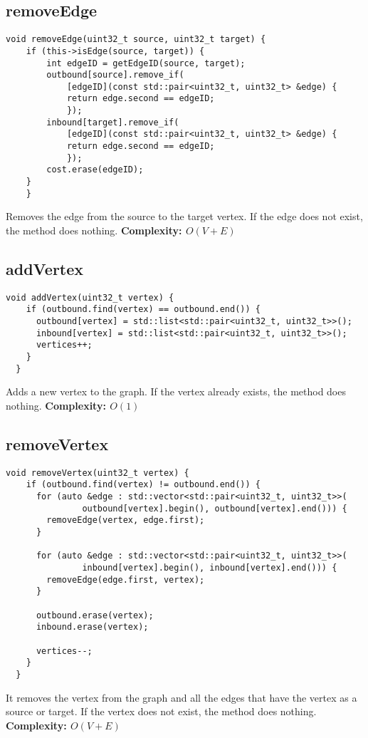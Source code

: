 \documentclass{article}
\begin{document}
\subsection*{removeEdge}

\begin{verbatim}
void removeEdge(uint32_t source, uint32_t target) {
    if (this->isEdge(source, target)) {
        int edgeID = getEdgeID(source, target);
        outbound[source].remove_if(
            [edgeID](const std::pair<uint32_t, uint32_t> &edge) {
            return edge.second == edgeID;
            });
        inbound[target].remove_if(
            [edgeID](const std::pair<uint32_t, uint32_t> &edge) {
            return edge.second == edgeID;
            });
        cost.erase(edgeID);
    }
    }
\end{verbatim}
Removes the edge from the source to the target vertex. If the edge does not exist, the method does nothing.
\textbf{Complexity: $O(V + E)$}

\subsection*{addVertex}

\begin{verbatim}
void addVertex(uint32_t vertex) {
    if (outbound.find(vertex) == outbound.end()) {
      outbound[vertex] = std::list<std::pair<uint32_t, uint32_t>>();
      inbound[vertex] = std::list<std::pair<uint32_t, uint32_t>>();
      vertices++;
    }
  }
\end{verbatim}
Adds a new vertex to the graph. If the vertex already exists, the method does nothing.
\textbf{Complexity: $O(1)$}

\subsection*{removeVertex}

\begin{verbatim}
void removeVertex(uint32_t vertex) {
    if (outbound.find(vertex) != outbound.end()) {
      for (auto &edge : std::vector<std::pair<uint32_t, uint32_t>>(
               outbound[vertex].begin(), outbound[vertex].end())) {
        removeEdge(vertex, edge.first);
      }

      for (auto &edge : std::vector<std::pair<uint32_t, uint32_t>>(
               inbound[vertex].begin(), inbound[vertex].end())) {
        removeEdge(edge.first, vertex);
      }

      outbound.erase(vertex);
      inbound.erase(vertex);

      vertices--;
    }
  }
\end{verbatim}
It removes the vertex from the graph and all the edges that have the vertex as a source or target. If the vertex does not exist, the method does nothing.
\textbf{Complexity: $O(V + E)$}
\end{document}
